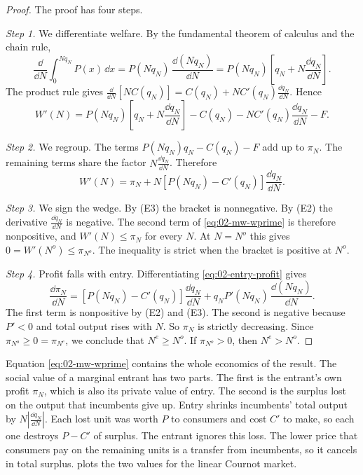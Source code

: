 \begin{proof}
The proof has four steps.

\emph{Step 1.} We differentiate welfare. By the fundamental theorem of calculus and the chain rule,
\begin{equation*}
\frac{\dd}{\dd N}\int_0^{N q_N} P(x)\,\dd x = P(N q_N)\,\frac{\dd (N q_N)}{\dd N}
= P(N q_N)\left[q_N + N \frac{\dd q_N}{\dd N}\right].
\end{equation*}
The product rule gives $\frac{\dd}{\dd N}\left[N C(q_N)\right] = C(q_N) + N C'(q_N)\frac{\dd q_N}{\dd N}$. Hence
\begin{equation}\label{eq:02-mw-wprime-raw}
W'(N) = P(N q_N)\left[q_N + N\frac{\dd q_N}{\dd N}\right] - C(q_N) - N C'(q_N)\frac{\dd q_N}{\dd N} - F .
\end{equation}

\emph{Step 2.} We regroup. The terms $P(N q_N)q_N - C(q_N) - F$ add up to $\pi_N$. The remaining terms share the factor
$N\frac{\dd q_N}{\dd N}$. Therefore
\begin{equation}\label{eq:02-mw-wprime}
W'(N) = \pi_N + N\left[P(N q_N) - C'(q_N)\right]\frac{\dd q_N}{\dd N} .
\end{equation}

\emph{Step 3.} We sign the wedge. By (E3) the bracket is nonnegative. By (E2) the derivative $\frac{\dd q_N}{\dd N}$ is
negative. The second term of \eqref{eq:02-mw-wprime} is therefore nonpositive, and $W'(N) \le \pi_N$ for every $N$.
At $N = N^o$ this gives $0 = W'(N^o) \le \pi_{N^o}$. The inequality is strict when the bracket is positive at $N^o$.

\emph{Step 4.} Profit falls with entry. Differentiating \eqref{eq:02-entry-profit} gives
\begin{equation}\label{eq:02-mw-dpi}
\frac{\dd \pi_N}{\dd N} = \left[P(N q_N) - C'(q_N)\right]\frac{\dd q_N}{\dd N}
+ q_N P'(N q_N)\,\frac{\dd (N q_N)}{\dd N} .
\end{equation}
The first term is nonpositive by (E2) and (E3). The second is negative because $P' < 0$ and total output rises with
$N$. So $\pi_N$ is strictly decreasing. Since $\pi_{N^o} \ge 0 = \pi_{N^e}$, we conclude that $N^e \ge N^o$. If
$\pi_{N^o} > 0$, then $N^e > N^o$.
\end{proof}

Equation \eqref{eq:02-mw-wprime} contains the whole economics of the result. The social value of a marginal entrant
has two parts. The first is the entrant's own profit $\pi_N$, which is also its private value of entry. The second is
the surplus lost on the output that incumbents give up. Entry shrinks incumbents' total output by
$N\left|\frac{\dd q_N}{\dd N}\right|$. Each lost unit was worth $P$ to consumers and cost $C'$ to make, so each one
destroys $P - C'$ of surplus. The entrant ignores this loss. The lower price that consumers pay on the remaining units
is a transfer from incumbents, so it cancels in total surplus.  plots the two values for the
linear Cournot market.

